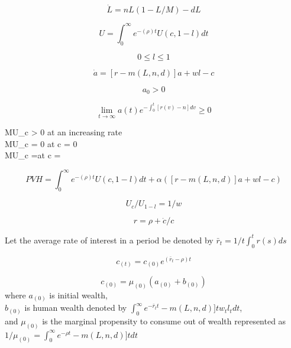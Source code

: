 \documentclass[12pt]{article}%
\begin{document}
\begin{equation}
\dot{L} = nL(1-L/M) -dL
\end{equation}

\begin{equation}
U=\int_{0}^{\infty} e^{-(\rho)t}   U(c,1-l) dt
\end{equation}

\begin{equation}
 0 \leq l \leq 1
\end{equation}

\begin{equation}
\dot{a} = [r - m(L,n ,d)]a + wl -c
\end{equation}

\begin{equation}
a_{0} > 0
\end{equation}

\begin{equation}
\lim_{t\to\infty} a(t) e^{-\int_{0}^{t} [r(v)-n] dv} \geq 0
\end{equation}

MU_{c} > 0  at an increasing rate \\
MU_{c} = 0 at c = 0 \\
MU_{c} =\infty at c = \infty

\begin{equation}
PVH=\int_{0}^{\infty} e^{-(\rho)t}   U(c,1-l) dt + \alpha([r - m(L,n ,d)]a + wl -c)
\end{equation}

\begin{equation}
U_{c}/U_{1-l} = 1/w
\end{equation}

\begin{equation}
r = \rho + \dot{c}/c
\end{equation}

Let the average rate of interest in a period be denoted by $\bar{r}_{t} = 1/t \int_{0}^{t} r(s) ds$

\begin{equation}
c_{(t)} = c_{(0)} e^{(\bar{r}_{t} - \rho)t}
\end{equation}

\begin{equation}
c_{(0)} = \mu_{(0)} (a_{(0)} + b_{(0)})
\end{equation}
where $a_{(0)}$ is initial wealth, \\
 $b_{(0)}$ is human wealth denoted by $\int_{0}^{\infty} e^{-\bar{r}_{t}t} - m(L,n,d)]t w_{t} l_{t} dt$, \\
and $\mu_{(0)}$ is the marginal propensity to consume out of wealth represented as $1/\mu_{(0)} = \int_{0}^{\infty} e^{-\rho t} - m(L,n ,d)]  t dt$
\end{document}
